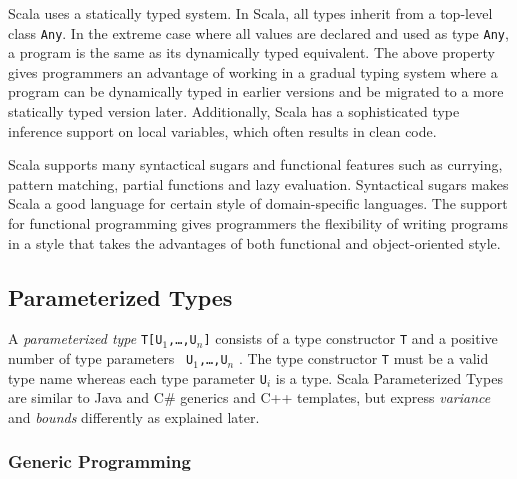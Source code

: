Scala uses a statically typed system.  In Scala, all types inherit from a top-level class {\tt Any}.
In the extreme case where all values are declared and used as type {\tt Any}, a program is
the same as its dynamically typed equivalent.  The above property gives programmers an
advantage of working in a gradual typing system where a program can be dynamically typed
in earlier versions and be migrated to a more statically typed version later.  Additionally,
Scala has a sophisticated type inference support on local variables, which often results in
clean code.
 
Scala supports many syntactical sugars and functional features such as currying, pattern matching, partial functions
and lazy evaluation.  Syntactical sugars makes Scala a good language for certain style of domain-specific languages.  
The support for functional programming gives programmers the flexibility of writing programs in
a style that takes the advantages of both functional and object-oriented style.  




\subsection{Parameterized Types}
\label{scala_parameterized_type}
A {\it parameterized type} {\tt T[U$_1$,\dots,U$_n$]} consists of a type 
constructor {\tt T} and a positive number of type parameters {\tt 
U$_1$,\dots,U$_n$} \citep{scala_specification}.  The type constructor {\tt T} 
must be a valid type name whereas each type parameter {\tt U$_i$} is a type.  Scala Parameterized Types are similar 
to Java and C\# generics and C++ templates, but express {\it variance} and {\it 
bounds} differently as explained later.

\subsubsection{Generic Programming}
\label{scala_generic}  
  
